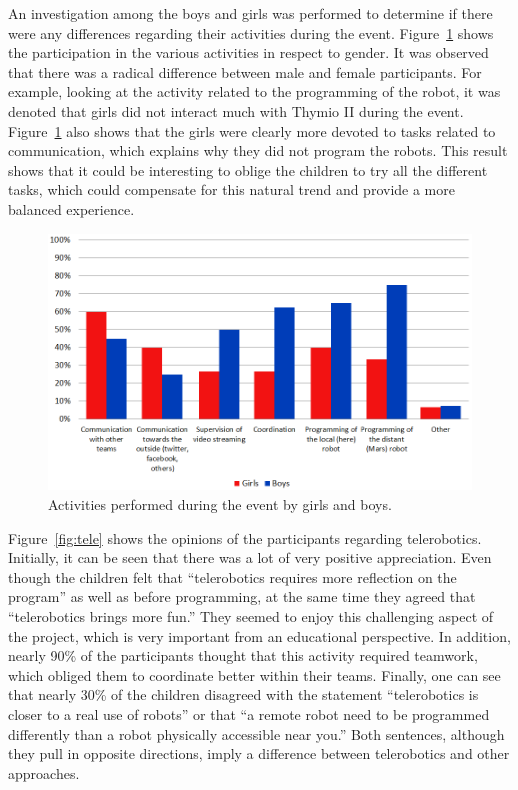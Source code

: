 \documentclass{intech-journal}
\begin{document}
An investigation among the boys and girls was performed to determine if there were any differences regarding their activities during the event.
Figure~\ref{fig:activities} shows the participation in the various activities in respect to gender. 
It was observed that there was a radical difference between male and female participants. 
For example, looking at the activity related to the programming of the robot, it was denoted that girls did not interact much with Thymio II during the event. 
Figure~\ref{fig:activities} also shows that the girls were clearly more devoted to tasks related to communication, which explains why they did not program the robots. 
This result shows that it could be interesting to oblige the children to try all the different tasks, which could compensate for this natural trend and provide a more balanced experience.

\begin{figure}[ht]
 \centering
    \includegraphics[width=0.7\columnwidth]{figures/activities.png}
  \caption{Activities performed during the event by girls and boys.}
  \label{fig:activities} 
\end{figure}

Figure~\ref{fig:tele} shows the opinions of the participants regarding telerobotics. 
Initially, it can be seen that there was a lot of very positive appreciation. 
Even though the children felt that ``telerobotics requires more reflection on the program'' as well as before programming, at the same time they agreed that ``telerobotics brings more fun.'' 
They seemed to enjoy this challenging aspect of the project, which is very important from an educational perspective. 
In addition, nearly 90\% of the participants thought that this activity required teamwork, which obliged them to coordinate better within their teams. 
Finally, one can see that nearly 30\% of the children disagreed with the statement ``telerobotics is closer to a real use of robots'' or that ``a remote robot need to be programmed differently than a robot physically accessible near you.''
Both sentences, although they pull in opposite directions, imply a difference between telerobotics and other approaches.
\end{document}

